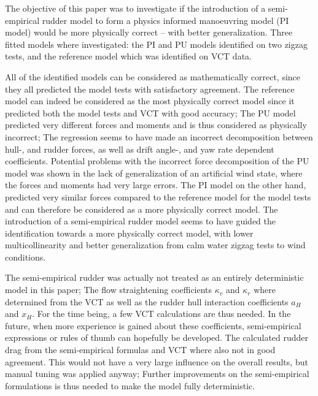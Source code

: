 %
The objective of this paper was to investigate if the introduction of a semi-empirical rudder model to form a physics informed manoeuvring model (PI model) would be more physically correct -- with better generalization.
Three fitted models where investigated: the PI and PU models identified on two zigzag tests, and the reference model which was identified on VCT data.

All of the identified models can be considered as mathematically correct, since they all predicted the model tests with satisfactory agreement.
The reference model can indeed be considered as the most physically correct model since it predicted both the model tests and VCT with good accuracy;
The PU model predicted very different forces and moments and is thus considered as physically incorrect; 
The regression seems to have made an incorrect decomposition between hull-, and rudder forces, as well as drift angle-, and yaw rate dependent coefficients.
Potential problems with the incorrect force decomposition of the PU model was shown in the lack of generalization of an artificial wind state, where the forces and moments had very large errors.
The PI model on the other hand, predicted very similar forces compared to the reference model for the model tests and can therefore be considered as a more physically correct model.
The introduction of a semi-empirical rudder model seems to have guided the identification towards a more physically correct model, with lower multicollinearity and better generalization from calm water zigzag tests to wind conditions.

The semi-empirical rudder was actually not treated as an entirely deterministic model in this paper; The flow straightening coefficients $\kappa_v$ and $\kappa_r$ where determined from the VCT as well as the rudder hull interaction coefficients $a_H$ and $x_H$. For the time being, a few VCT calculations are thus needed.
In the future, when more experience is gained about these coefficients, semi-empirical expressions or rules of thumb can hopefully be developed.
The calculated rudder drag from the semi-empirical formulas and VCT where also not in good agreement.
This would not have a very large influence on the overall results, but manual tuning was applied anyway;
Further improvements on the semi-empirical formulations is thus needed to make the model fully deterministic.
